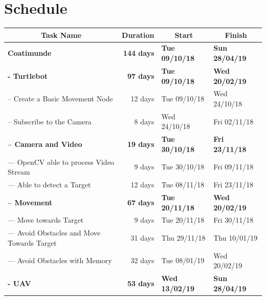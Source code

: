 \documentclass{article}
\begin{document}
	
\section{Schedule}

\begin{table}[H]
	\begin{tabular}{|l|r|l|l|}
		\hline
		\multicolumn{1}{|c|}{\textbf{Task Name}}            & \multicolumn{1}{c|}{\textbf{Duration}} & \multicolumn{1}{c|}{\textbf{Start}} & \multicolumn{1}{c|}{\textbf{Finish}} \\ \hline
		\textbf{Coatimunde}              		    & \textbf{144 days} & \textbf{Tue 09/10/18} & \textbf{Sun 28/04/19} \\ \hline
		\textbf{- Turtlebot}                                & \textbf{97 days}  & \textbf{Tue 09/10/18} & \textbf{Wed 20/02/19} \\ \hline
		-- Create a Basic Movement Node                     & 12 days           & Tue 09/10/18          & Wed 24/10/18          \\ \hline
		-- Subscribe to the Camera                          & 8 days            & Wed 24/10/18          & Fri 02/11/18          \\ \hline
		\textbf{-- Camera and Video}                        & \textbf{19 days}  & \textbf{Tue 30/10/18} & \textbf{Fri 23/11/18} \\ \hline
		--- OpenCV able to process Video Stream 	    & 9 days            & Tue 30/10/18          & Fri 09/11/18          \\ \hline
		--- Able to detect a Target                         & 12 days           & Tue 08/11/18          & Fri 23/11/18          \\ \hline
		\textbf{-- Movement}                                & \textbf{67 days}  & \textbf{Tue 20/11/18} & \textbf{Wed 20/02/19} \\ \hline
		--- Move towards Target                             & 9 days            & Tue 20/11/18          & Fri 30/11/18          \\ \hline
		--- Avoid Obstacles and Move Towards Target         & 31 days           & Thu 29/11/18          & Thu 10/01/19          \\ \hline
		--- Avoid Obstacles with Memory 		    & 32 days           & Tue 08/01/19          & Wed 20/02/19          \\ \hline
		\textbf{- UAV}                                      & \textbf{53 days}  & \textbf{Wed 13/02/19} & \textbf{Sun 28/04/19} \\ \hline

\end{tabular}
\end{table}
\end{document}
